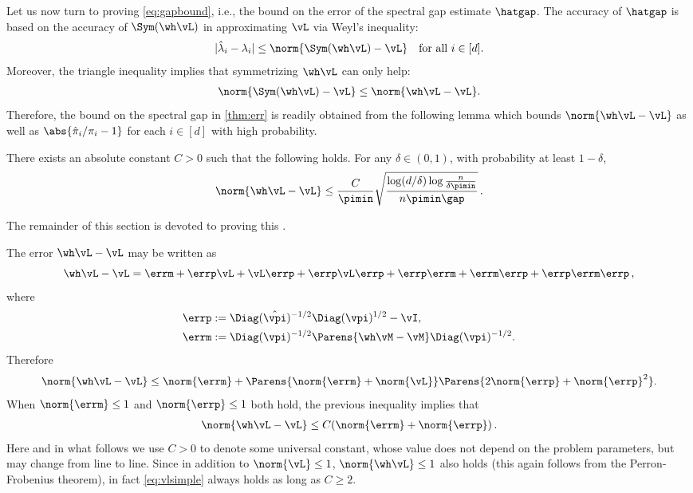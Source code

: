 
Let us now turn to proving \eqref{eq:gapbound}, i.e., 
the bound on the error of the spectral gap estimate $\hatgap$.
The accuracy of $\hatgap$ is based on the accuracy of $\Sym(\wh\vL)$
in approximating $\vL$ via Weyl's inequality:
\begin{align*}%
  |\hat\lambda_i - \lambda_i|
  \leq \norm{\Sym(\wh\vL) - \vL}
  \quad \text{for all }i \in [d] .
\end{align*}
Moreover, the triangle inequality implies that symmetrizing $\wh\vL$
can only help:
\begin{align*}
  \norm{\Sym(\wh\vL) - \vL} \leq \norm{\wh\vL - \vL} .
\end{align*}
Therefore, the bound on the spectral gap in \cref{thm:err} is readily obtained from the
following lemma which bounds $\norm{\wh\vL - \vL}$ as well as $\abs{
\hat\pi_i/\pi_i - 1 }$ for each $i \in [d]$ with high probability.
\begin{lemma}
  \label{lem:err}
  There exists an absolute constant $C>0$ such that the following
  holds.
  For any $\delta \in (0,1)$, with probability at least $1-\delta$,
  \begin{equation*}
    \norm{\wh\vL - \vL}
    \leq
    \frac{C}{\pimin}
      \sqrt{\frac{\log(d/\delta)\log\frac{n}{\delta\pimin}}{n\pimin\gap}} \,.
  \end{equation*}
\end{lemma}
The remainder of this section is devoted to proving this .

The error $\wh\vL - \vL$ may be written as
\[
  \wh\vL - \vL
  = \errm + \errp \vL + \vL \errp + \errp \vL \errp
  + \errp \errm + \errm \errp + \errp \errm \errp\,,
\]
where
\begin{align*}
  \errp & := \Diag(\hat\vpi)^{-1/2} \Diag(\vpi)^{1/2} - \vI , \\
  \errm & := \Diag(\vpi)^{-1/2} \Parens{
    \wh\vM - \vM
  } \Diag(\vpi)^{-1/2} .
\end{align*}
Therefore
\begin{align*}%
  \norm{\wh\vL - \vL}
  \leq \norm{\errm} +
  \Parens{
    \norm{\errm} + \norm{\vL}
  }
  \Parens{
    2\norm{\errp} + \norm{\errp}^2
  }
  .
\end{align*}
When  $\norm{\errm}\le 1$ and $\norm{\errp}\le 1$ both hold, the previous inequality implies that
\begin{align}\label{eq:vlsimple}
\norm{\wh\vL - \vL} \le C(\norm{\errm}+\norm{\errp})\,.
\end{align}
Here and in what follows we use $C>0$ to denote some universal constant, whose value does not depend on the problem parameters, but may change from line to line.
Since in addition to $\norm{\vL}\le 1$,  $\norm{\wh\vL}\le 1$ also holds (this again follows from the Perron-Frobenius theorem), in fact  \eqref{eq:vlsimple}  always holds as long as $C\ge 2$.

